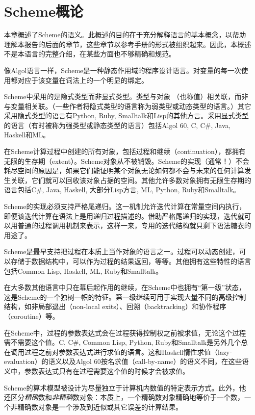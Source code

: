 \chapter{Scheme概论}
\label{semanticchapter}

本章概述了Scheme的语义。此概述的目的在于充分解释语言的基本概念，以帮助理解本报告的后面的章节，这些章节以参考手册的形式被组织起来。因此，本概述不是本语言的完整介绍，在某些方面也不够精确和规范。

\vest 像Algol语言一样，Scheme是一种静态作用域的程序设计语言。对变量的每一次使用都对应于该变量在词法上的一个明显的绑定。

\vest Scheme中采用的是隐式类型而非显式类型\cite{WaiteGoos}。类型与对象
（也称值）相关联，而非与变量相关联。（一些作者将隐式类型的语言称为弱类型或动态类型的语言。）其它采用隐式类型的语言有Python, Ruby, Smalltalk和Lisp的其他方言。采用显式类型的语言（有时被称为强类型或静态类型的语言）包括Algol 60, C, C#, Java, Haskell和ML。

\vest 在Scheme计算过程中创建的所有对象，包括过程和继续（continuation），都拥有无限的生存期（extent）。Scheme对象从不被销毁。Scheme的实现（通常！）不会耗尽空间的原因是，如果它们能证明某个对象无论如何都不会与未来的任何计算发生关联，它们就可以回收该对象占据的空间。其他允许多数对象拥有无限生存期的语言包括C#, Java, Haskell, 大部分Lisp方言, ML, Python, Ruby和Smalltalk。

Scheme的实现必须支持严格尾递归。这一机制允许迭代计算在常量空间内执行，即便该迭代计算在语法上是用递归过程描述的。借助严格尾递归的实现，迭代就可以用普通的过程调用机制来表示，这样一来，专用的迭代结构就只剩下语法糖衣的用途了。


\vest Scheme是最早支持把过程在本质上当作对象的语言之一。过程可以动态创建，可以存储于数据结构中，可以作为过程的结果返回，等等。其他拥有这些特性的语言包括Common Lisp, Haskell, ML, Ruby和Smalltalk。

\vest 在大多数其他语言中只在幕后起作用的继续，在Scheme中也拥有“第一级”状态，这是Scheme的一个独树一帜的特征。第一级继续可用于实现大量不同的高级控制结构，如非局部退出（non-local exits）、回溯（backtracking）和协作程序（coroutine）等。

在Scheme中，过程的参数表达式会在过程获得控制权之前被求值，无论这个过程需不需要这个值。C, C#, Common Lisp, Python, Ruby和Smalltalk是另外几个总在调用过程之前对参数表达式进行求值的语言。这和Haskell惰性求值（lazy-evaluation）的语义以及Algol 60按名求值（call-by-name）的语义不同，在这些语义中，参数表达式只有在过程需要这个值的时候才会被求值。

Scheme的算术模型被设计为尽量独立于计算机内数值的特定表示方式。此外，他
还区分\textit{精确}数和\textit{非精确}数对象：本质上，一个精确数对象精确地等价于一个数，一个非精确数对象是一个涉及到近似或其它误差的计算结果。

